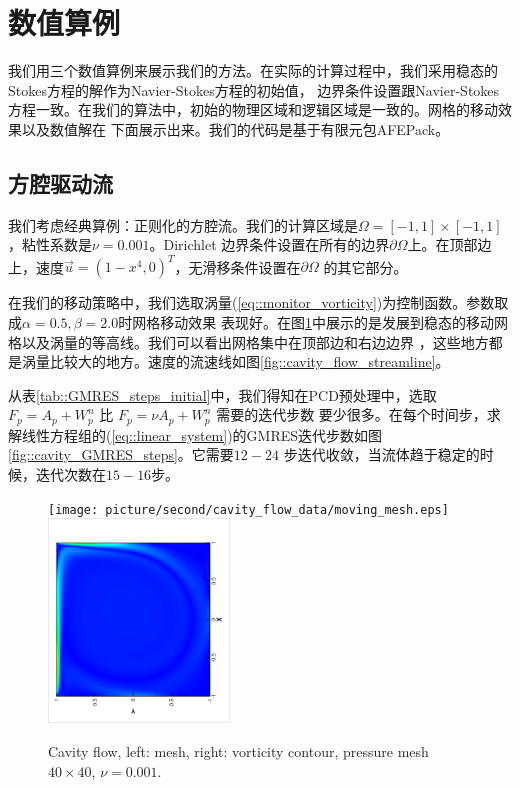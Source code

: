 \section{数值算例}
      我们用三个数值算例来展示我们的方法。在实际的计算过程中，我们采用稳态的Stokes方程的解作为Navier-Stokes方程的初始值，
      边界条件设置跟Navier-Stokes方程一致。在我们的算法中，初始的物理区域和逻辑区域是一致的。网格的移动效果以及数值解在
      下面展示出来。我们的代码是基于有限元包AFEPack。

     \subsection{方腔驱动流}
       我们考虑经典算例：正则化的方腔流。我们的计算区域是$\Omega = [-1, 1] \times [-1, 1]$，粘性系数是$\nu = 0.001$。Dirichlet
       边界条件设置在所有的边界$\partial \Omega$上。在顶部边上，速度$\vec{u} = (1 - x^4, 0)^T$，无滑移条件设置在$\partial \Omega$
       的其它部分。

       在我们的移动策略中，我们选取涡量(\ref{eq::monitor_vorticity})为控制函数。参数取成$\alpha = 0.5, \beta = 2.0$时网格移动效果
       表现好。在图\ref{fig::cavity_flow_mesh}中展示的是发展到稳态的移动网格以及涡量的等高线。我们可以看出网格集中在顶部边和右边边界
       ，这些地方都是涡量比较大的地方。速度的流速线如图\ref{fig::cavity_flow_streamline}。

       从表\ref{tab::GMRES_steps_initial}中，我们得知在PCD预处理中，选取$F_p = A_p + W_p^n$ 比 $F_p = \nu A_p + W_p^n$ 需要的迭代步数
       要少很多。在每个时间步，求解线性方程组的(\ref{eq::linear_system})的GMRES迭代步数如图\ref{fig::cavity_GMRES_steps}。它需要$12-24$
       步迭代收敛，当流体趋于稳定的时候，迭代次数在$15-16$步。


       \begin{figure}[!htbp]
         \begin{center}
             \texttt{[image: picture/second/cavity\_flow\_data/moving\_mesh.eps]}
             \includegraphics[width = 0.43\textwidth, angle = -90]{picture/second/cavity_flow_data/vortex.eps}
        \end{center}
        \caption{\small Cavity flow, left: mesh, right: vorticity
          contour, pressure mesh $40 \times 40$, $\nu = 0.001$.}
        \label{fig::cavity_flow_mesh}
       \end{figure}

